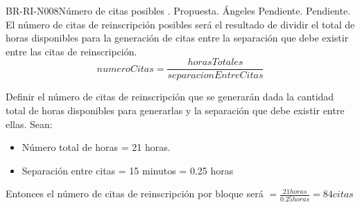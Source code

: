 \begin{BusinessRule}{BR-RI-N008}{Número de citas posibles}
	{\bcDerivation}    %
	{\btTimer} %
	{\blControlling}  %
	.
	\BRItem[Estado] Propuesta.
	 Ángeles
	 Pendiente.
	 Pendiente.
	\BRItem[Descripción] El número de citas de reinscripción posibles será el resultado de dividir el total de horas disponibles para la generación de citas entre la separación que debe existir entre las citas de reinscripción.
	\BRItem[Sentencia] \cdtEmpty
		$$ numeroCitas = \frac{horasTotales}{separacionEntreCitas} $$
	
	
	\BRItem[Motivación] Definir el número de citas de reinscripción que se generarán dada la cantidad total de horas disponibles para generarlas y la separación que debe existir entre ellas.
	\BRItem[Ejemplo]
	Sean:
	\begin{itemize}
		\item Número total de horas = 21 horas.
		\item Separación entre citas = 15 minutos = 0.25 horas
	\end{itemize}
	Entonces el número de citas de reinscripción por bloque será $= \frac{21 horas}{0.25 horas} = 84 citas$ 
\end{BusinessRule}

